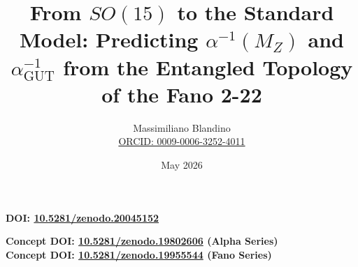 \documentclass[12pt]{article}
\title{From $SO(15)$ to the Standard Model: Predicting $\alpha^{-1}(M_Z)$ and $\alpha_{\mathrm{GUT}}^{-1}$ from the Entangled Topology of the Fano 2-22}
\author{Massimiliano Blandino \\ 
\href{https://orcid.org/0009-0006-3252-4011}{ORCID: 0009-0006-3252-4011}}
\date{May 2026}
\begin{document}
\maketitle

\begin{center}
\large\textbf{DOI: \href{https://doi.org/10.5281/zenodo.20045152}{10.5281/zenodo.20045152}}
\end{center}

\vspace{0.2cm}

\begin{center}
\large\textbf{Concept DOI: \href{https://doi.org/10.5281/zenodo.19802606}{10.5281/zenodo.19802606} (Alpha Series)} \\
\large\textbf{Concept DOI: \href{https://doi.org/10.5281/zenodo.19955544}{10.5281/zenodo.19955544} (Fano Series)}
\end{center}

\vspace{0.5cm}
\end{document}
